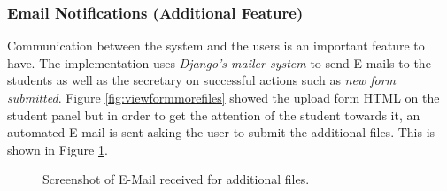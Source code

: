 \documentclass[../main.tex]{subfiles}
\begin{document}
\subsubsection{Email Notifications (Additional Feature)}
Communication between the system and the users is an important feature to have. The implementation uses \textit{Django's mailer system} to send E-mails to the students as well as the secretary on successful actions such as \emph{new form submitted}. Figure \ref{fig:viewformmorefiles} showed the upload form HTML on the student panel but in order to get the attention of the student towards it, an automated E-mail is sent asking the user to submit the additional files. This is shown in Figure \ref{fig:emailuploadfiles}.

\begin{figure}[H]
        \caption{\label{fig:emailuploadfiles} Screenshot of E-Mail received for additional files.}
      \end{figure}
\end{document}
